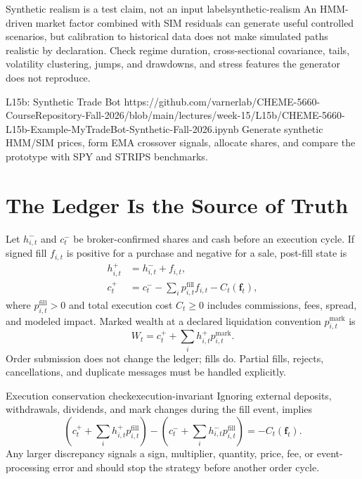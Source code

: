 \documentclass[11pt]{article}
\begin{document}
\begin{remark}{Synthetic realism is a test claim, not an input label}{synthetic-realism}
An HMM-driven market factor combined with SIM residuals can generate useful controlled scenarios, but calibration to historical data does not make simulated paths realistic by declaration. Check regime duration, cross-sectional covariance, tails, volatility clustering, jumps, and drawdowns, and stress features the generator does not reproduce.
\end{remark}

\notebooklink
  {L15b: Synthetic Trade Bot}
  {https://github.com/varnerlab/CHEME-5660-CourseRepository-Fall-2026/blob/main/lectures/week-15/L15b/CHEME-5660-L15b-Example-MyTradeBot-Synthetic-Fall-2026.ipynb}
  {Generate synthetic HMM/SIM prices, form EMA crossover signals, allocate shares, and compare the prototype with SPY and STRIPS benchmarks.}

\section{The Ledger Is the Source of Truth}

Let $h_{i,t}^-$ and $c_t^-$ be broker-confirmed shares and cash before an execution cycle. If signed fill $f_{i,t}$ is positive for a purchase and negative for a sale, post-fill state is
\begin{align}
  \label{eq:fill-ledger}
  h_{i,t}^+&=h_{i,t}^-+f_{i,t},\\
  c_t^+&=c_t^--\sum_i p_{i,t}^{\mathrm{fill}}f_{i,t}
  -C_t(\mathbf f_t),
\end{align}
where $p_{i,t}^{\mathrm{fill}}>0$ and total execution cost $C_t\geq0$ includes commissions, fees, spread, and modeled impact. Marked wealth at a declared liquidation convention $p_{i,t}^{\mathrm{mark}}$ is
\begin{equation}
  \label{eq:marked-wealth}
  W_t=c_t^++\sum_i h_{i,t}^+p_{i,t}^{\mathrm{mark}}.
\end{equation}
Order submission does not change the ledger; fills do. Partial fills, rejects, cancellations, and duplicate messages must be handled explicitly.

\begin{theorem}{Execution conservation check}{execution-invariant}
Ignoring external deposits, withdrawals, dividends, and mark changes during the fill event,  implies
\begin{equation}
  \label{eq:execution-conservation}
  \left(c_t^++\sum_i h_{i,t}^+p_{i,t}^{\mathrm{fill}}\right)
  -\left(c_t^-+\sum_i h_{i,t}^-p_{i,t}^{\mathrm{fill}}\right)
  =-C_t(\mathbf f_t).
\end{equation}
Any larger discrepancy signals a sign, multiplier, quantity, price, fee, or event-processing error and should stop the strategy before another order cycle.
\end{theorem}
\end{document}
